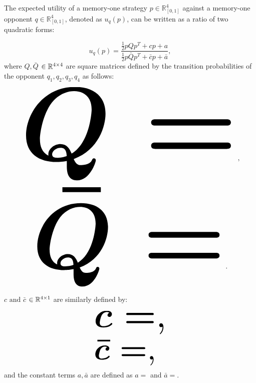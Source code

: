 \begin{theorem}\label{theorem:quadratic_form_u}
    The expected utility of a memory-one strategy \(p\in\mathbb{R}_{[0,1]}^4\)
    against a memory-one opponent \(q\in\mathbb{R}_{[0,1]}^4\), denoted
    as \(u_q(p)\), can be written as a ratio of two quadratic forms:

    \begin{equation}\label{eq:optimisation_quadratic}
    u_q(p) = \frac{\frac{1}{2}pQp^T + cp + a}
                {\frac{1}{2}p\bar{Q}p^T + \bar{c}p + \bar{a}},
    \end{equation}
    where \(Q, \bar{Q}\) \(\in \mathbb{R}^{4\times4}\) are square matrices defined by the
    transition probabilities of the opponent \(q_1, q_2, q_3, q_4\) as follows:

    \begin{center}
    \begin{equation}
    \resizebox{0.9\linewidth}{!}{\arraycolsep=2.5pt%
    \boldmath\(
    Q = \)},
    \end{equation}
    \begin{equation}\label{eq:q_bar_matrix}
    \resizebox{0.8\linewidth}{!}{\arraycolsep=2.5pt%
    \boldmath\(
    \bar{Q} =  \)}.
    \end{equation}
    \end{center}

    \(c \text{ and } \bar{c}\) \(\in \mathbb{R}^{4 \times 1}\) are similarly defined by:

    \begin{equation}\label{eq:q_matrix_numerator}
    \resizebox{0.3\linewidth}{!}{\arraycolsep=2.5pt%
    \boldmath\(c = \),}
    \end{equation}
    \begin{equation}\label{eq:q_matrix_denominator}
    \resizebox{0.3\linewidth}{!}{\arraycolsep=2.5pt%
    \boldmath\(\bar{c} = \),
    }
    \end{equation}
    and the constant terms \(a, \bar{a}\) are defined as \(a = \) and
    \(\bar{a} = \).
\end{theorem}

